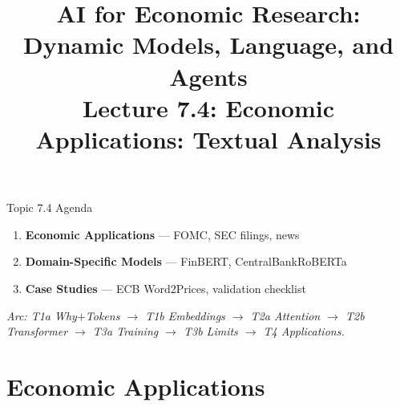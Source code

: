 


\graphicspath{{./pic/}{../../MiniCourse_8hr/Slides/Module3_LLM_Text/pic/}{../}}

\title[AI for Econ Research]{AI for Economic Research: Dynamic Models, Language, and Agents\\
Lecture 7.4: Economic Applications: Textual Analysis}



\makebeamertitle

\begin{frame}{Topic 7.4 Agenda}
\begin{enumerate}
  \item \textbf{Economic Applications} --- FOMC, SEC filings, news
  \medskip
  \item \textbf{Domain-Specific Models} --- FinBERT, CentralBankRoBERTa
  \medskip
  \item \textbf{Case Studies} --- ECB Word2Prices, validation checklist
\end{enumerate}

\bigskip
\footnotesize\textit{Arc: T1a Why$+$Tokens $\to$ T1b Embeddings $\to$ T2a Attention $\to$ T2b Transformer $\to$ T3a Training $\to$ T3b Limits $\to$ T4 Applications.}
\end{frame}

\section{Economic Applications}

